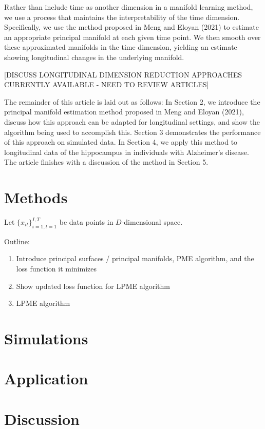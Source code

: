 \documentclass[11pt,reqno]{article}
\begin{document}
Rather than include time as another dimension in a manifold learning method, we use a process that maintains the interpretability of the time dimension. Specifically, we use the method proposed in Meng and Eloyan (2021) to estimate an appropriate principal manifold at each given time point. We then smooth over these approximated manifolds in the time dimension, yielding an estimate showing longitudinal changes in the underlying manifold.

[DISCUSS LONGITUDINAL DIMENSION REDUCTION APPROACHES CURRENTLY AVAILABLE - NEED TO REVIEW ARTICLES]

The remainder of this article is laid out as follows: In Section 2, we introduce the principal manifold estimation method proposed in Meng and Eloyan (2021), discuss how this approach can be adapted for longitudinal settings, and show the algorithm being used to accomplish this. Section 3 demonstrates the performance of this approach on simulated data. In Section 4, we apply this method to longitudinal data of the hippocampus in individuals with Alzheimer's disease. The article finishes with a discussion of the method in Section 5.

\section{Methods}

Let $\{x_{it}\}_{i=1, t=1}^{I, T}$ be data points in $D$-dimensional space.

Outline:
\begin{enumerate}
    \item Introduce principal surfaces / principal manifolds, PME algorithm, and the loss function it minimizes
    \item Show updated loss function for LPME algorithm
    \item LPME algorithm
\end{enumerate}

\section{Simulations}

\section{Application}

\section{Discussion}
\end{document}
